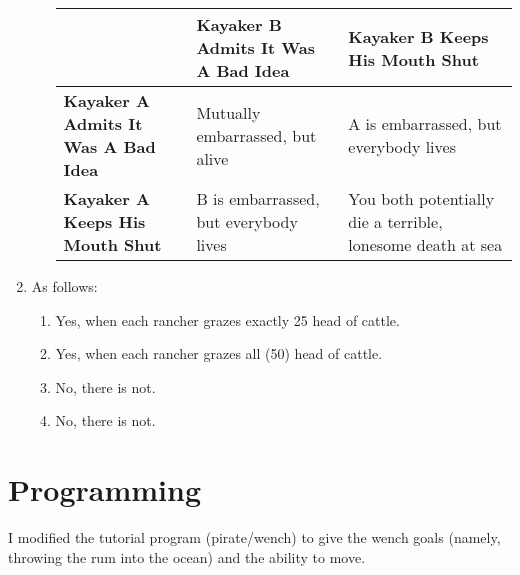 \documentclass{article}
\begin{document}
\begin{enumerate}
\begin{enumerate}
\begin{center}
\begin{tabular}{ p{3cm} || p{3cm} | p{3cm} }
    & \textbf{Kayaker B Admits It Was A Bad Idea} & \textbf{Kayaker B Keeps His Mouth Shut} \\ \hline \hline
  \textbf{Kayaker A Admits It Was A Bad Idea} & Mutually embarrassed, but alive & A is embarrassed, but everybody lives \\ \hline
  \textbf{Kayaker A Keeps His Mouth Shut} & B is embarrassed, but everybody lives & You both potentially die a terrible, lonesome death at sea\\
\end{tabular}
\end{center}


\end{enumerate}

\item{} %

As follows:

\begin{enumerate}

\item{} Yes, when each rancher grazes exactly 25 head of cattle.

\item{} Yes, when each rancher grazes all (50) head of cattle.

\item{} No, there is not.

\item{} No, there is not.

\end{enumerate}

\end{enumerate}

\section*{Programming}

I modified the tutorial program (pirate/wench) to give the wench goals (namely, throwing the rum into the ocean) and the ability to move.
\end{document}
